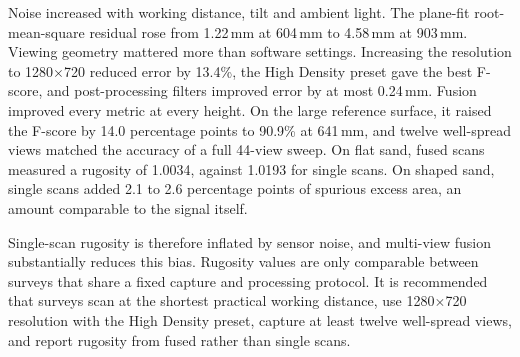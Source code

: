 Noise increased with working distance, tilt and ambient light. The plane-fit root-mean-square residual rose from 1.22\,mm at 604\,mm to 4.58\,mm at 903\,mm. Viewing geometry mattered more than software settings. Increasing the resolution to 1280$\times$720 reduced error by 13.4\%, the High Density preset gave the best F-score, and post-processing filters improved error by at most 0.24\,mm. Fusion improved every metric at every height. On the large reference surface, it raised the F-score by 14.0 percentage points to 90.9\% at 641\,mm, and twelve well-spread views matched the accuracy of a full 44-view sweep. On flat sand, fused scans measured a rugosity of 1.0034, against 1.0193 for single scans. On shaped sand, single scans added 2.1 to 2.6 percentage points of spurious excess area, an amount comparable to the signal itself.

Single-scan rugosity is therefore inflated by sensor noise, and multi-view fusion substantially reduces this bias. Rugosity values are only comparable between surveys that share a fixed capture and processing protocol. It is recommended that surveys scan at the shortest practical working distance, use 1280$\times$720 resolution with the High Density preset, capture at least twelve well-spread views, and report rugosity from fused rather than single scans.
